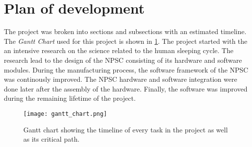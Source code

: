 \section{Plan of development}

The project was broken into sections and subsections with an estimated timeline.\\
The \textit{Gantt Chart} used for this project is shown in \cref{fig:gant}. The project started with the an intensive research on the science related to the human sleeping cycle. The research lead to the design of the NPSC consisting of its hardware and software modules. During the manufacturing process, the software framework of the NPSC was continously improved. The NPSC hardware and software integration were done later after the assembly of the hardware. Finally, the software was improved during the remaining lifetime of the project.
\begin{figure}[ht]
\centering
\texttt{[image: gantt\_chart.png]}
\caption{Gantt chart showing the timeline of every task in the project as well as its critical path.}
\label{fig:gant}
\end{figure}

